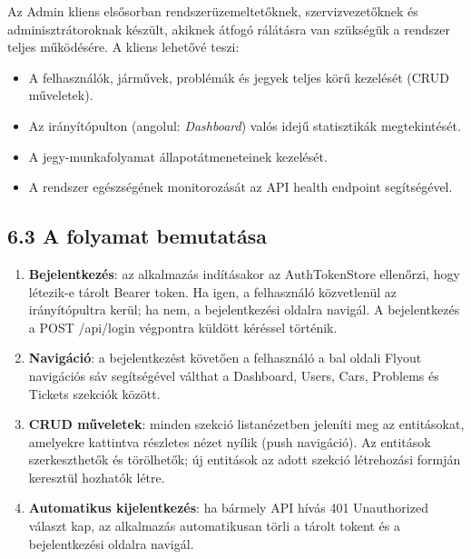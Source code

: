 Az Admin kliens elsősorban rendszerüzemeltetőknek, szervizvezetőknek és adminisztrátoroknak készült, akiknek átfogó rálátásra van szükségük a rendszer teljes működésére. A kliens lehetővé teszi:

\begin{itemize}
\item
  A felhasználók, járművek, problémák és jegyek teljes körű kezelését (CRUD műveletek).
\item
  Az irányítópulton (angolul: \emph{Dashboard}) valós idejű statisztikák megtekintését.
\item
  A jegy-munkafolyamat állapotátmeneteinek kezelését.
\item
  A rendszer egészségének monitorozását az API health endpoint segítségével.
\end{itemize}

\subsection{6.3 A folyamat bemutatása}\label{a-folyamat-bemutatuxe1sa}

\begin{enumerate}
\def\labelenumi{\arabic{enumi}.}
\item
  \textbf{Bejelentkezés}: az alkalmazás indításakor az AuthTokenStore ellenőrzi, hogy létezik-e tárolt Bearer token. Ha igen, a felhasználó közvetlenül az irányítópultra kerül; ha nem, a bejelentkezési oldalra navigál. A bejelentkezés a POST /api/login végpontra küldött kéréssel történik.
\item
  \textbf{Navigáció}: a bejelentkezést követően a felhasználó a bal oldali Flyout navigációs sáv segítségével válthat a Dashboard, Users, Cars, Problems és Tickets szekciók között.
\item
  \textbf{CRUD műveletek}: minden szekció listanézetben jeleníti meg az entitásokat, amelyekre kattintva részletes nézet nyílik (push navigáció). Az entitások szerkeszthetők és törölhetők; új entitások az adott szekció létrehozási formján keresztül hozhatók létre.
\item
  \textbf{Automatikus kijelentkezés}: ha bármely API hívás 401 Unauthorized választ kap, az alkalmazás automatikusan törli a tárolt tokent és a bejelentkezési oldalra navigál.
\end{enumerate}

\section{}\label{section-2}

